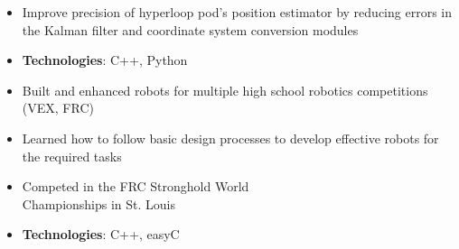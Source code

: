 \documentclass[10pt, letterpaper, ragged2e, withhyper]{altacv}
\begin{document}
\begin{paracol}{2}
    \divider
    
    \begin{itemize}
        \item Improve precision of hyperloop pod's position estimator by reducing errors in the Kalman filter and 
        coordinate system conversion modules
        \item \textbf{Technologies}: C++, Python 
    \end{itemize}

    \divider

    \begin{itemize}
        \item Built and enhanced robots for multiple high school robotics competitions (VEX, FRC)
        \item Learned how to follow basic design processes to develop effective robots for the required tasks
        \item Competed in the FRC Stronghold World\\ Championships in St. Louis 
        \item \textbf{Technologies}: C++, easyC 
    \end{itemize}
     
    \divider


\end{paracol}
\end{document}
